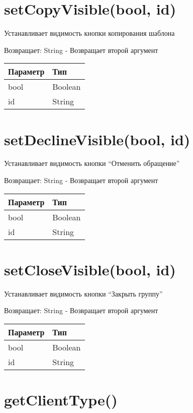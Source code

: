 \hypertarget{setcopyvisiblebool-id-string}{%
\section{setCopyVisible(bool, id)}\label{setcopyvisiblebool-id-string}}

Устанавливает видимость кнопки копирования шаблона

Возвращает: String - Возвращает второй аргумент

\begin{longtable}[]{@{}ll@{}}
\toprule
Параметр & Тип\tabularnewline
\midrule
\endhead
bool & Boolean\tabularnewline
id & String\tabularnewline
\bottomrule
\end{longtable}

\hypertarget{setdeclinevisiblebool-id-string}{%
\section{setDeclineVisible(bool, id)}\label{setdeclinevisiblebool-id-string}}

Устанавливает видимость кнопки ``Отменить обращение''

Возвращает: String - Возвращает второй аргумент

\begin{longtable}[]{@{}ll@{}}
\toprule
Параметр & Тип\tabularnewline
\midrule
\endhead
bool & Boolean\tabularnewline
id & String\tabularnewline
\bottomrule
\end{longtable}

\hypertarget{setclosevisiblebool-id-string}{%
\section{setCloseVisible(bool, id)}\label{setclosevisiblebool-id-string}}

Устанавливает видимость кнопки ``Закрыть группу''

Возвращает: String - Возвращает второй аргумент

\begin{longtable}[]{@{}ll@{}}
\toprule
Параметр & Тип\tabularnewline
\midrule
\endhead
bool & Boolean\tabularnewline
id & String\tabularnewline
\bottomrule
\end{longtable}

\hypertarget{getclienttype-string}{%
\section{getClientType()}\label{getclienttype-string}}

